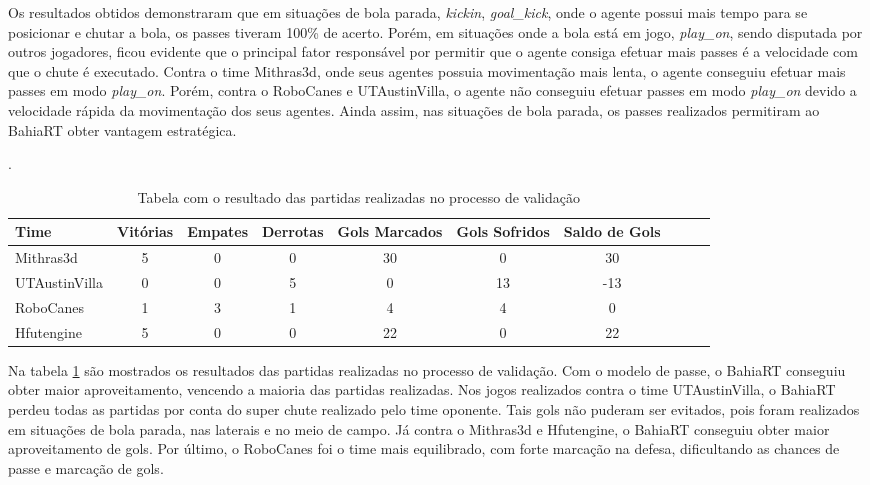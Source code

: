 Os resultados obtidos demonstraram que em situações de bola parada, \textit{kickin}, \textit{goal\_kick}, 
onde o agente possui mais tempo para se posicionar e chutar a bola, os passes tiveram 100\% de acerto. Porém, em situações onde 
a bola está em jogo, \textit{play\_on}, sendo disputada por outros jogadores, ficou evidente que o principal fator responsável 
por permitir que o agente consiga efetuar mais passes é a velocidade com que o chute é executado. Contra o time Mithras3d, onde 
seus agentes possuia movimentação mais lenta, o agente conseguiu efetuar mais passes em modo \textit{play\_on}. Porém, contra o 
RoboCanes e UTAustinVilla, o agente não conseguiu efetuar passes em modo \textit{play\_on} devido a velocidade rápida da movimentação 
dos seus agentes. Ainda assim, nas situações de bola parada, os passes realizados permitiram ao BahiaRT obter vantagem estratégica.

\begin{table}[H]

\centering
\caption{Tabela com o resultado das partidas realizadas no processo de validação}.

  \begin{tabular}{|p{3cm}|c|c|c|c|c|c|c|c|c|}
    \hline
    Time 		& Vitórias & Empates  & Derrotas & Gols Marcados & Gols Sofridos & Saldo de Gols \\ \hline
    Mithras3d	  	& 5        & 0   & 0  & 30  &  0 & 30  \\ \hline
    UTAustinVilla 	& 0        & 0   & 5  &  0  & 13 & -13 \\ \hline
    RoboCanes 	  	& 1        & 3   & 1  &  4  & 4  & 0 	\\ \hline
    Hfutengine	  	& 5	   & 0   & 0  & 22  & 0  & 22  \\ \hline
    
  \end{tabular}

  \label{tab:tabelajogos}
\end{table}

Na tabela \ref{tab:tabelajogos} são mostrados os resultados das partidas realizadas no processo de validação. Com o modelo de passe, 
o BahiaRT conseguiu obter maior aproveitamento, vencendo a maioria das partidas realizadas. Nos jogos realizados contra o time UTAustinVilla, 
o BahiaRT perdeu todas as partidas por conta do super chute realizado pelo time oponente. Tais gols não puderam ser evitados, pois foram realizados 
em situações de bola parada, nas laterais e no meio de campo. Já contra o Mithras3d e Hfutengine, o BahiaRT conseguiu obter maior aproveitamento de gols. 
Por último, o RoboCanes foi o time mais equilibrado, com forte marcação na defesa, dificultando as chances de passe e marcação de gols.

